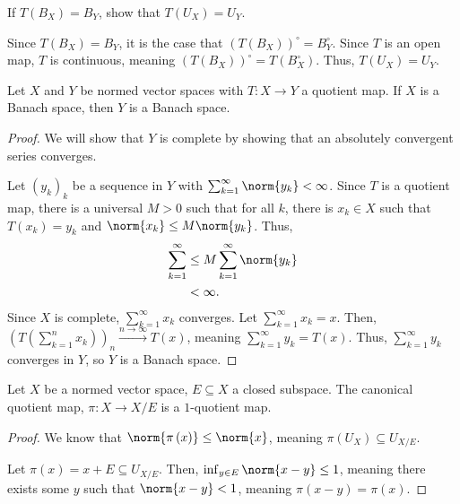 \documentclass[10pt]{mypackage}
\begin{document}
\begin{exercise}
  If $T\left(B_X\right) = B_Y$, show that $T\left(U_X\right) = U_Y$.
\end{exercise}
\begin{solution}
  Since $T\left(B_X\right) = B_Y$, it is the case that $\left(T\left(B_X\right)\right)^{\circ} = B_Y^{\circ}$. Since $T$ is an open map, $T$ is continuous, meaning $\left(T\left(B_X\right)\right)^{\circ} = T\left(B_X^{\circ}\right)$. Thus, $T\left(U_X\right) = U_Y$.
\end{solution}
\begin{proposition}
  Let $X$ and $Y$ be normed vector spaces with $T: X\rightarrow Y$ a quotient map. If $X$ is a Banach space, then $Y$ is a Banach space.
\end{proposition}
\begin{proof}
  We will show that $Y$ is complete by showing that an absolutely convergent series converges.\newline

  Let $\left(y_k\right)_k$ be a sequence in $Y$ with $\sum_{k=1}^{\infty}\norm{y_k} < \infty$. Since $T$ is a quotient map, there is a universal $M > 0$ such that for all $k$, there is $x_k\in X$ such that $T\left(x_k\right) = y_k$ and $\norm{x_k} \leq M\norm{y_k}$. Thus,
  \begin{align*}
    \sum_{k=1}^{\infty} &\leq M\sum_{k=1}^{\infty}\norm{y_k}\\
    &< \infty.
  \end{align*}
  Since $X$ is complete, $\sum_{k=1}^{\infty}x_k$ converges. Let $\sum_{k=1}^{\infty}x_k = x$. Then, $\left(T\left(\sum_{k=1}^{n}x_k\right)\right)_n\xrightarrow{n\rightarrow\infty}T(x) $, meaning $\sum_{k=1}^{\infty}y_k = T(x)$. Thus, $\sum_{k=1}^{\infty}y_k$ converges in $Y$, so $Y$ is a Banach space.
\end{proof}
\begin{proposition}
  Let $X$ be a normed vector space, $E\subseteq X$ a closed subspace. The canonical quotient map, $\pi: X\rightarrow X/E$ is a $1$-quotient map.
\end{proposition}
\begin{proof}
  We know that $\norm{\pi\left(x\right)} \leq \norm{x}$, meaning $\pi\left(U_X\right)\subseteq U_{X/E}$.\newline

  Let $\pi(x) = x+E \subseteq U_{X/E}$. Then, $\inf_{y\in E}\norm{x-y}\leq 1$, meaning there exists some $y$ such that $\norm{x-y} < 1$, meaning $\pi\left(x-y\right) = \pi(x)$.
\end{proof}
\end{document}
